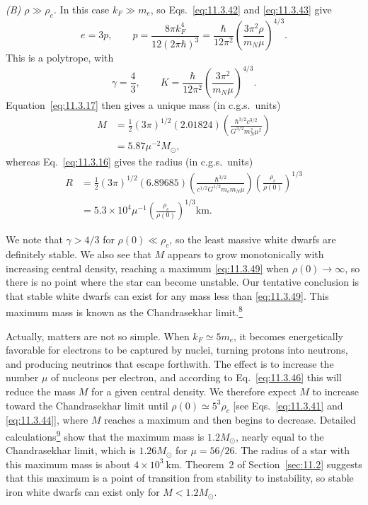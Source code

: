 \emph{(B) \(\rho\gg\rho_c\).} In this case \(k_F\gg m_e\), so
Eqs.~\eqref{eq:11.3.42} and \eqref{eq:11.3.43} give
\[
  e=3p,
  \qquad
  p
  =
  \frac{8\pi k_F^4}{12(2\pi\hbar)^3}
  =
  \frac{\hbar}{12\pi^2}
  \left(\frac{3\pi^2\rho}{m_N\mu}\right)^{4/3}.
\]
This is a polytrope, with
\begin{equation}
  \gamma=\frac43,\qquad
  K
  =
  \frac{\hbar}{12\pi^2}
  \left(\frac{3\pi^2}{m_N\mu}\right)^{4/3}.
  \tag{11.3.48}\label{eq:11.3.48}
\end{equation}
Equation~\eqref{eq:11.3.17} then gives a unique mass (in c.g.s.\ units)
\begin{equation}
  \begin{split}
  M
  &=
  \frac12(3\pi)^{1/2}(2.01824)
  \left(
    \frac{\hbar^{3/2}c^{3/2}}
    {G^{3/2}m_N^2\mu^2}
  \right)\\
  &=
  5.87\mu^{-2}M_\odot,
  \end{split}
  \tag{11.3.49}\label{eq:11.3.49}
\end{equation}
whereas Eq.~\eqref{eq:11.3.16} gives the radius (in c.g.s.\ units)
\begin{equation}
  \begin{split}
  R
  &=
  \frac12(3\pi)^{1/2}(6.89685)
  \left(
    \frac{\hbar^{3/2}}
    {c^{1/2}G^{1/2}m_em_N\mu}
  \right)
  \left(\frac{\rho_c}{\rho(0)}\right)^{1/3}\\
  &=
  5.3\times10^4\mu^{-1}
  \left(\frac{\rho_c}{\rho(0)}\right)^{1/3}\mathrm{km}.
  \end{split}
  \tag{11.3.50}\label{eq:11.3.50}
\end{equation}

We note that \(\gamma>4/3\) for \(\rho(0)\ll\rho_c\), so the least massive
white dwarfs are definitely stable. We also see that \(M\) appears to grow
monotonically with increasing central density, reaching a maximum
\eqref{eq:11.3.49} when \(\rho(0)\to\infty\), so there is no point where the
star can become unstable. Our tentative conclusion is that stable white dwarfs
can exist for any mass less than \eqref{eq:11.3.49}. This maximum mass is
known as the Chandrasekhar
limit.\hyperref[ch11-ref-8]{\textsuperscript{8}}

Actually, matters are not so simple. When \(k_F\simeq5m_e\), it becomes
energetically favorable for electrons to be captured by nuclei, turning
protons into neutrons, and producing neutrinos that escape forthwith. The
effect is to increase the number \(\mu\) of nucleons per electron, and
according to Eq.~\eqref{eq:11.3.46} this will reduce the mass \(M\) for a
given central density. We therefore expect \(M\) to increase toward the
Chandrasekhar limit until \(\rho(0)\simeq5^3\rho_c\) [see
Eqs.~\eqref{eq:11.3.41} and \eqref{eq:11.3.44}], where \(M\) reaches a
maximum and then begins to decrease. Detailed
calculations\hyperref[ch11-ref-9]{\textsuperscript{9}} show that the maximum
mass is \(1.2M_\odot\), nearly equal to the Chandrasekhar limit, which is
\(1.26M_\odot\) for \(\mu=56/26\). The radius of a star with this maximum mass
is about \(4\times10^3\ \mathrm{km}\). Theorem~2 of
Section~\ref{sec:11.2} suggests that this maximum is a point of transition
from stability to instability, so stable iron white dwarfs can exist only for
\(M<1.2M_\odot\).

